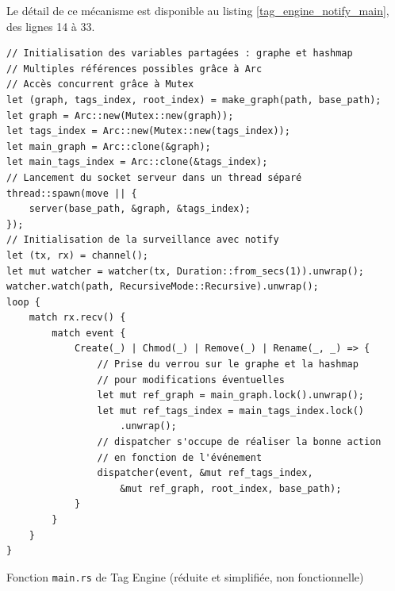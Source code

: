 Le détail de ce mécanisme est disponible au listing \ref{tag_engine_notify_main}, des lignes 14 à 33.
\bigbreak
\begin{code}
    \begin{verbatim}
// Initialisation des variables partagées : graphe et hashmap
// Multiples références possibles grâce à Arc 
// Accès concurrent grâce à Mutex
let (graph, tags_index, root_index) = make_graph(path, base_path);
let graph = Arc::new(Mutex::new(graph));
let tags_index = Arc::new(Mutex::new(tags_index));
let main_graph = Arc::clone(&graph);
let main_tags_index = Arc::clone(&tags_index);
// Lancement du socket serveur dans un thread séparé
thread::spawn(move || {
    server(base_path, &graph, &tags_index);
});
// Initialisation de la surveillance avec notify
let (tx, rx) = channel();
let mut watcher = watcher(tx, Duration::from_secs(1)).unwrap();
watcher.watch(path, RecursiveMode::Recursive).unwrap();
loop {
    match rx.recv() {
        match event {
            Create(_) | Chmod(_) | Remove(_) | Rename(_, _) => {
                // Prise du verrou sur le graphe et la hashmap 
                // pour modifications éventuelles
                let mut ref_graph = main_graph.lock().unwrap();
                let mut ref_tags_index = main_tags_index.lock()
                    .unwrap();
                // dispatcher s'occupe de réaliser la bonne action
                // en fonction de l'événement
                dispatcher(event, &mut ref_tags_index,
                    &mut ref_graph, root_index, base_path);
            }
        }
    }
}
    \end{verbatim}
    \caption{Fonction \texttt{main.rs} de Tag Engine (réduite et simplifiée, non fonctionnelle)}
    \label{tag_engine_notify_main}
\end{code}
\bigbreak

